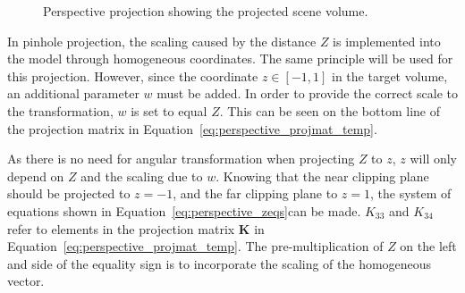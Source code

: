 \begin{figure}[!htb]
    \caption{Perspective projection showing the projected scene volume.}
    \label{fig:theory_perspective_projection_volume}
\end{figure}

In pinhole projection, the scaling caused by the distance $Z$ is implemented into the model through homogeneous coordinates. The same principle will be used for this projection. However, since the coordinate $z \in [-1,1]$ in the target volume, an additional parameter $w$ must be added. In order to provide the correct scale to the transformation, $w$ is set to equal $Z$. This can be seen on the bottom line of the projection matrix in Equation~\eqref{eq:perspective_projmat_temp}.

As there is no need for angular transformation when projecting $Z$ to $z$, $z$ will only depend on $Z$ and the scaling due to $w$. Knowing that the near clipping plane should be projected to $z=-1$, and the far clipping plane to $z=1$, the system of equations shown in Equation~\eqref{eq:perspective_zeqs}can be made. $K_{33}$ and $K_{34}$ refer to elements in the projection matrix $\mathbf{K}$ in Equation~\eqref{eq:perspective_projmat_temp}. The pre-multiplication of $Z$ on the left and side of the equality sign is to incorporate the scaling of the homogeneous vector.

